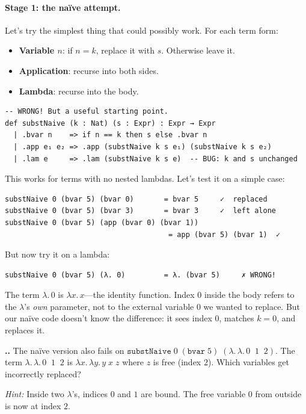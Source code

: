 \documentclass[11pt,a4paper]{article}
\newcounter{exercise}[section]
\renewcommand{\theexercise}{\thesection.\arabic{exercise}}
\theoremstyle{definition}
\newcommand{\lam}{\lambda}
\begin{document}
\paragraph{Stage 1: the na\"ive attempt.}

Let's try the simplest thing that could possibly work. For each term form:

\begin{itemize}[leftmargin=2em]
\item \textbf{Variable $n$}: if $n = k$, replace it with $s$. Otherwise leave it.
\item \textbf{Application}: recurse into both sides.
\item \textbf{Lambda}: recurse into the body.
\end{itemize}

\begin{verbatim}
-- WRONG! But a useful starting point.
def substNaive (k : Nat) (s : Expr) : Expr → Expr
  | .bvar n    => if n == k then s else .bvar n
  | .app e₁ e₂ => .app (substNaive k s e₁) (substNaive k s e₂)
  | .lam e     => .lam (substNaive k s e)  -- BUG: k and s unchanged
\end{verbatim}

This works for terms with no nested lambdas. Let's test it on a simple case:

\begin{verbatim}
substNaive 0 (bvar 5) (bvar 0)       = bvar 5     ✓  replaced
substNaive 0 (bvar 5) (bvar 3)       = bvar 3     ✓  left alone
substNaive 0 (bvar 5) (app (bvar 0) (bvar 1))
                                      = app (bvar 5) (bvar 1)  ✓
\end{verbatim}

But now try it on a lambda:

\begin{verbatim}
substNaive 0 (bvar 5) (λ. 0)         = λ. (bvar 5)     ✗ WRONG!
\end{verbatim}

The term $\lam.\, 0$ is $\lam x.\, x$---the identity function. Index $0$
inside the body refers to the $\lam$'s \emph{own} parameter, not to the
external variable $0$ we wanted to replace. But our na\"ive code doesn't know
the difference: it sees index $0$, matches $k = 0$, and replaces it.

\begin{exercisebox}
\textbf{\theexercise.}\; The na\"ive version also fails on $\texttt{substNaive}\;0\;(\texttt{bvar}\;5)\;(\lam.\, \lam.\, 0\;\;1\;\;2)$. The term $\lam.\,\lam.\, 0\;\;1\;\;2$ is $\lam x.\,\lam y.\, y\;x\;z$ where $z$ is free (index $2$). Which variables get incorrectly replaced?

\emph{Hint:} Inside two $\lam$'s, indices $0$ and $1$ are bound. The free variable $0$ from outside is now at index $2$.
\end{exercisebox}
\end{document}
